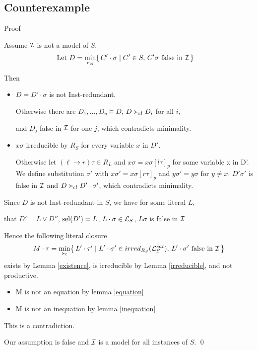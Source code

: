 \documentclass[%
handout,
]{beamer}
\begin{document}
\subsection{Counterexample}
\begin{frame}[allowframebreaks]{Proof}

    Assume $\mathcal{I}$ is not a model of $S$.
    \begin{align*}
        \text{Let }
        D &= \min_{\mathrel\succ_{\!cl}}\{\,
        C'\cdot\sigma \mid C'\in S,\,
        C'\sigma\text{ false in }\mathcal{I}\,
        \}
    \end{align*}

    Then
    \begin{itemize}
        \item $D = D'\cdot\sigma$ is not Inst-redundant.
        \vspace{0.2em}

        Otherwise there are
        $D_1,\ldots,D_n\models D$, $D\mathrel\succ_{\!cl} D_i$ for all $i$,

        and $D_j$ false in $\mathcal{I}$ for one $j$, which contradicts minimality.

        \item $x\sigma$ irreducible by $R_S$ for every variable $x$ in $D'$.
        \vspace{0.2em}

        Otherwise let $(\ell\to r)\tau\in R_L$ and $x\sigma = x\sigma[l\tau]_p$ for some variable x in D'.
        We define substitution $\sigma'$ with $x\sigma' = x\sigma[r\tau]_p$ and $y\sigma' = y\sigma$ for $y\neq x$.
        $D'\sigma'$ is false in $\mathcal{I}$ and $D\mathrel\succ_{\!cl} D'\cdot\sigma'$,
        which contradicts minimality.
    \end{itemize}

\framebreak

    Since $D$ is not Inst-redundant in $S$,
    we have for some literal $L$,

    that $D' = L\lor D''$, $\operatorname{sel}(D') = L$, $L\cdot\sigma\in\mathcal{L}_S$,
    $L\sigma$ is false in $\mathcal{I}$
    \vspace{0.7em}

    Hence the following literal closure
    \begin{gather*}
        M\cdot\tau = \min_{\mathrel\succ_{\!\ell}}\!
\left\{\,
    L'\cdot\tau' \mid
    L'\cdot\sigma' \in irred_{R_S}(\mathcal{L}_S^{sat}),\,
    L'\cdot\sigma'\text{ false in }\mathcal{I}\,
\right\}
    \end{gather*}
    exists by Lemma \ref{existence}, is irreducible by Lemma \ref{irreducible},
    and not productive.

    \begin{itemize}
        \item M is not an equation by lemma \ref{equation}
        \item M is not an inequation by lemma \ref{inequation}
    \end{itemize}

    This is a contradiction.

    Our assumption is false and $\mathcal{I}$ is a model for all instances of $S$.
    \hfill\qed

\end{frame}
\end{document}
